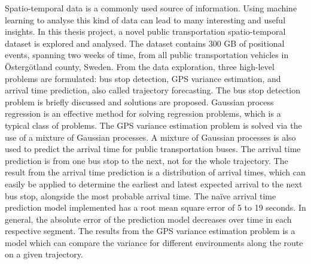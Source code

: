 Spatio-temporal data is a commonly used source of information. 
Using machine learning to analyse this kind of data can lead to many interesting and useful insights.
In this thesis project, a novel public transportation spatio-temporal dataset is explored and analysed.
The dataset contains 300 GB of positional events, spanning two weeks of time, from all public transportation vehicles in Östergötland county, Sweden.
From the data exploration, three high-level problems are formulated: bus stop detection, GPS variance estimation, and arrival time prediction, also called trajectory forecasting.
The bus stop detection problem is briefly discussed and solutions are proposed.
Gaussian process regression is an effective method for solving regression problems, which is a typical class of problems.
The GPS variance estimation problem is solved via the use of a mixture of Gaussian processes.
A mixture of Gaussian processes is also used to predict the arrival time for public transportation buses.
The arrival time prediction is from one bus stop to the next, not for the whole trajectory.
The result from the arrival time prediction is a distribution of arrival times, which can easily be applied to determine the earliest and latest expected arrival to the next bus stop, alongside the most probable arrival time.
The naïve arrival time prediction model implemented has a root mean square error of 5 to 19 seconds.
In general, the absolute error of the prediction model decreases over time in each respective segment.
The results from the GPS variance estimation problem is a model which can compare the variance for different environments along the route on a given trajectory.